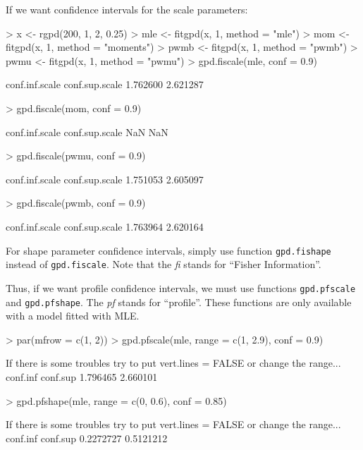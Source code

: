 \documentclass[a4paper]{article}
\numberwithin{equation}{section}
\theoremstyle{definition}
\begin{document}
If we want confidence intervals for the scale parameters:
\begin{Schunk}
\begin{Sinput}
> x <- rgpd(200, 1, 2, 0.25)
> mle <- fitgpd(x, 1, method = "mle")
> mom <- fitgpd(x, 1, method = "moments")
> pwmb <- fitgpd(x, 1, method = "pwmb")
> pwmu <- fitgpd(x, 1, method = "pwmu")
> gpd.fiscale(mle, conf = 0.9)
\end{Sinput}
\begin{Soutput}
conf.inf.scale conf.sup.scale 
      1.762600       2.621287 
\end{Soutput}
\begin{Sinput}
> gpd.fiscale(mom, conf = 0.9)
\end{Sinput}
\begin{Soutput}
conf.inf.scale conf.sup.scale 
           NaN            NaN 
\end{Soutput}
\begin{Sinput}
> gpd.fiscale(pwmu, conf = 0.9)
\end{Sinput}
\begin{Soutput}
conf.inf.scale conf.sup.scale 
      1.751053       2.605097 
\end{Soutput}
\begin{Sinput}
> gpd.fiscale(pwmb, conf = 0.9)
\end{Sinput}
\begin{Soutput}
conf.inf.scale conf.sup.scale 
      1.763964       2.620164 
\end{Soutput}
\end{Schunk}

For shape parameter confidence intervals, simply use function
\verb|gpd.fishape| instead of \verb|gpd.fiscale|. Note that the
\emph{fi} stands for ``Fisher Information''.

Thus, if we want profile confidence intervals, we must use functions
\verb|gpd.pfscale| and \verb|gpd.pfshape|. The \emph{pf} stands for
``profile''. These functions are only available with a model fitted
with MLE.
\begin{Schunk}
\begin{Sinput}
> par(mfrow = c(1, 2))
> gpd.pfscale(mle, range = c(1, 2.9), conf = 0.9)
\end{Sinput}
\begin{Soutput}
If there is some troubles try to put vert.lines = FALSE or change
 the range...
conf.inf conf.sup 
1.796465 2.660101 
\end{Soutput}
\begin{Sinput}
> gpd.pfshape(mle, range = c(0, 0.6), conf = 0.85)
\end{Sinput}
\begin{Soutput}
If there is some troubles try to put vert.lines = FALSE or change
 the range...
 conf.inf  conf.sup 
0.2272727 0.5121212 
\end{Soutput}
\end{Schunk}
\end{document}
